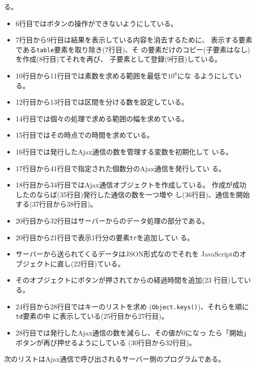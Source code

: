 \begin{Exec}
\begin{itemize}
        る。
        \begin{itemize}
         \item 6行目ではボタンの操作ができないようにしている。
         \item 7行目から9行目は結果を表示している内容を消去するために、
               表示する要素である\texttt{table}要素を取り除き(7行目)、そ
               の要素だけのコピー(子要素はなし)を作成(8行目)てそれを再び、
               子要素として登録(9行目)している。
         \item 10行目から11行目では素数を求める範囲を最低で$10^{6}$にな
               るようにしている。
         \item 12行目から13行目では区間を分ける数を設定している。
         \item 14行目では個々の処理で求める範囲の幅を求めている。
         \item 15行目ではその時点での時間を求めている。
         \item 16行目では発行したAjax通信の数を管理する変数を初期化して
               いる。
         \item 17行目から41行目で指定された個数分のAjax通信を発行してい
               る。
         \item 18行目から34行目ではAjax通信オブジェクトを作成している。
               作成が成功したのならば(35行目)発行した通信の数を一つ増や
               し(36行目)、通信を開始する(37行目から38行目)。
         \item 20行目から32行目はサーバーからのデータ処理の部分である。
         \item 20行目から21行目で表示1行分の要素\texttt{tr}を追加してい
               る。
         \item サーバーから送られてくるデータはJSON形式なのでそれを
               JavaScriptのオブジェクトに直し(22行目)ている。
         \item そのオブジェクトにボタンが押されてからの経過時間を追加(23
               行目)している。
         \item 24行目から28行目ではキーのリストを求め
               (\texttt{Object.keys()})、それらを順に\texttt{td}要素の中
               に表示している(25行目から27行目)。
         \item 28行目では発行したAjax通信の数を減らし、その値が$0$になっ
               たら「開始」ボタンが再び押せるようにしている
               (30行目から32行目)。
        \end{itemize}
 \end{itemize}
 次のリストはAjax通信で呼び出されるサーバー側のプログラムである。

\end{Exec}
